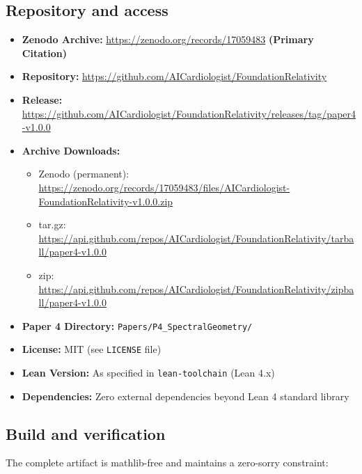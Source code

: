 \documentclass[11pt]{article}
\theoremstyle{plain}
\theoremstyle{definition}
\theoremstyle{remark}
\begin{document}
\subsection{Repository and access}
\begin{itemize}
\item \textbf{Zenodo Archive:} \url{https://zenodo.org/records/17059483} \textbf{(Primary Citation)}
\item \textbf{Repository:} \url{https://github.com/AICardiologist/FoundationRelativity}
\item \textbf{Release:} \url{https://github.com/AICardiologist/FoundationRelativity/releases/tag/paper4-v1.0.0}
\item \textbf{Archive Downloads:} 
  \begin{itemize}
  \item Zenodo (permanent): \url{https://zenodo.org/records/17059483/files/AICardiologist-FoundationRelativity-v1.0.0.zip}
  \item tar.gz: \url{https://api.github.com/repos/AICardiologist/FoundationRelativity/tarball/paper4-v1.0.0}
  \item zip: \url{https://api.github.com/repos/AICardiologist/FoundationRelativity/zipball/paper4-v1.0.0}
  \end{itemize}
\item \textbf{Paper 4 Directory:} \texttt{Papers/P4\_SpectralGeometry/}
\item \textbf{License:} MIT (see \texttt{LICENSE} file)
\item \textbf{Lean Version:} As specified in \texttt{lean-toolchain} (Lean 4.x)
\item \textbf{Dependencies:} Zero external dependencies beyond Lean 4 standard library
\end{itemize}

\subsection{Build and verification}
The complete artifact is mathlib-free and maintains a zero-sorry constraint:
\end{document}
